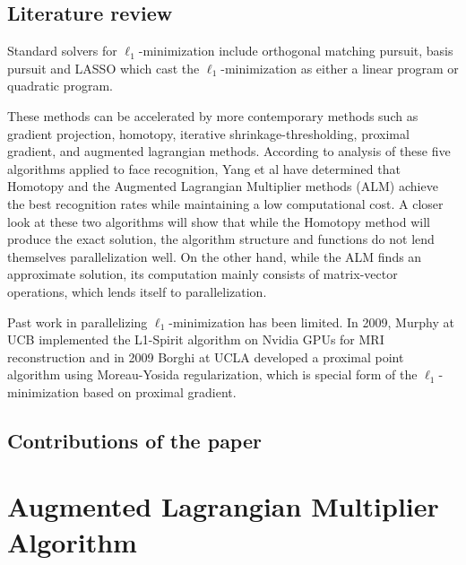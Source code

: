 \documentclass[10pt,twocolumn,letterpaper]{article}
\begin{document}

\subsection{Literature review}

Standard solvers for $\ell_1$-minimization include orthogonal matching pursuit, basis pursuit and LASSO which cast the $\ell_1$-minimization as either a linear program or quadratic program.  

These methods can be accelerated by more contemporary methods such as gradient projection, homotopy, iterative shrinkage-thresholding, proximal gradient, and augmented lagrangian methods.  According to analysis of these five algorithms applied to face recognition, Yang et al have determined that Homotopy and the Augmented Lagrangian Multiplier methods (ALM) achieve the best recognition rates while maintaining a low computational cost.  A closer look at these two algorithms will show that while the Homotopy method will produce the exact solution, the algorithm structure and functions do not lend themselves parallelization well.  
On the other hand, while the ALM finds an approximate solution, its computation mainly consists of matrix-vector operations, which lends itself to parallelization.

Past work in parallelizing $\ell_1$-minimization has been limited.  In 2009, Murphy at UCB implemented the L1-Spirit algorithm on Nvidia GPUs for MRI reconstruction and in 2009 Borghi at UCLA developed a proximal point algorithm using Moreau-Yosida regularization, which is special form of the $\ell_1$-minimization based on proximal gradient.  

\subsection{Contributions of the paper}

\section{Augmented Lagrangian Multiplier Algorithm}
\end{document}
